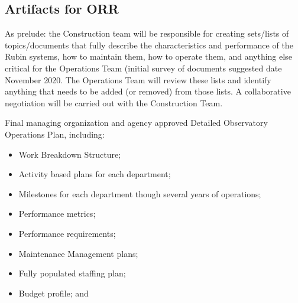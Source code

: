 \subsection{Artifacts for ORR}

 As prelude: the Construction team will be responsible for creating sets/lists of topics/documents that fully describe the characteristics and performance of the Rubin systems, how to maintain them, how to operate them, and anything else critical for the Operations Team (initial survey of documents suggested date November 2020. The Operations Team will review these lists and identify anything that needs to be added (or removed) from those lists. A collaborative negotiation will be carried out with the Construction Team.

Final managing organization and agency approved Detailed Observatory Operations Plan, including:

\begin{itemize}
	\item Work Breakdown Structure;
	\item Activity based plans for each department;
	\item Milestones for each department though several years of operations;
	\item Performance metrics;
	\item Performance requirements;
	\item Maintenance Management plans;
	\item Fully populated staffing plan;
	\item Budget profile; and
	
\end{itemize}
